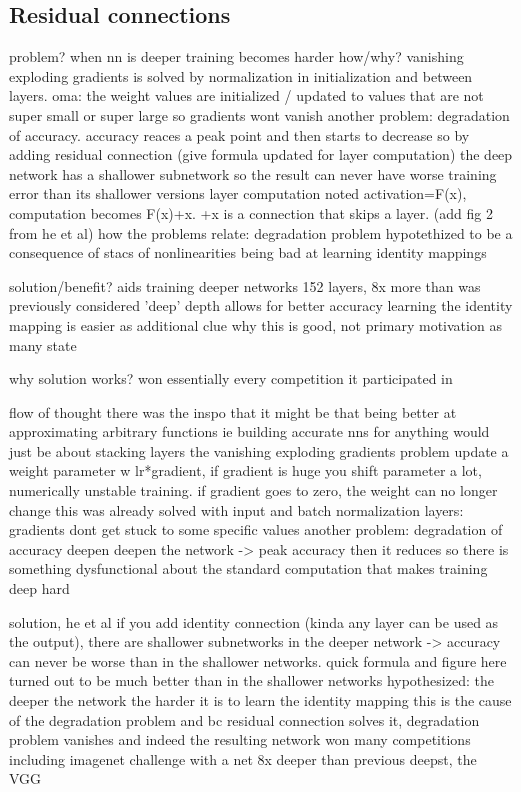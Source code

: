\documentclass{article}
\begin{document}
\subsection{Residual connections}

problem?
when nn is deeper training becomes harder
how/why?
vanishing exploding gradients is solved by normalization in initialization and between layers.
	oma: the weight values are initialized / updated to values that are not super small or super large so gradients wont vanish
another problem: degradation of accuracy. accuracy reaces a peak point and then starts to decrease
	so by adding residual connection (give formula updated for layer computation) the deep network has a shallower subnetwork so the result can never have worse training error than its shallower versions
		layer computation noted activation=F(x), computation becomes F(x)+x. +x is a connection that skips a layer. (add fig 2 from he et al)
how the problems relate: degradation problem hypotethized to be a consequence of stacs of nonlinearities being bad at learning identity mappings

solution/benefit?
aids training deeper networks
152 layers, 8x more than was previously considered 'deep'
depth allows for better accuracy
learning the identity mapping is easier as additional clue why this is good, not primary motivation as many state

why solution works?
won essentially every competition it participated in


flow of thought 
there was the inspo that it might be that being better at approximating arbitrary functions ie 
building accurate nns for anything would just be about stacking layers 
the vanishing exploding gradients problem
    update a weight parameter w lr*gradient, if gradient is huge you shift parameter a lot, numerically unstable training. if gradient goes to zero, the weight can no longer change 
    this was already solved with input and batch normalization layers: gradients dont get stuck to some specific values
another problem: degradation of accuracy
    deepen deepen the network -> peak accuracy then it reduces
        so there is something dysfunctional about the standard computation that makes training deep hard 

solution, he et al
if you add identity connection (kinda any layer can be used as the output),
there are shallower subnetworks in the deeper network -> accuracy can never be worse than 
in the shallower networks.
    quick formula and figure here
turned out to be much better than in the shallower networks
    hypothesized: the deeper the network the harder it is to learn the identity mapping 
        this is the cause of the degradation problem and bc residual connection solves it, degradation problem vanishes 
and indeed the resulting network won many competitions including imagenet challenge with a net 8x deeper than previous deepst, the VGG
\end{document}
